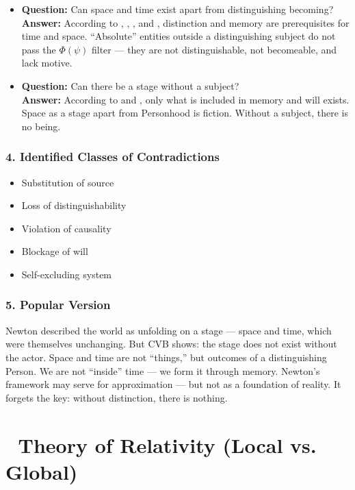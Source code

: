 \documentclass[12pt]{article}
\begin{document}
\begin{itemize}
\item \textbf{Question:} Can space and time exist apart from distinguishing becoming?  
\\ \textbf{Answer:} According to \text{[4.4]}, \text{[9.1]}, \text{[10.3.7]}, and \text{[12]}, distinction and memory are prerequisites for time and space. ``Absolute'' entities outside a distinguishing subject do not pass the $\Phi(\psi)$ filter — they are not distinguishable, not becomeable, and lack motive.

\item \textbf{Question:} Can there be a stage without a subject?  
\\ \textbf{Answer:} According to \text{[10.3.8]} and \text{[10.6]}, only what is included in memory and will exists. Space as a stage apart from Personhood is fiction. Without a subject, there is no being.
\end{itemize}

\subsubsection*{4. Identified Classes of Contradictions}

\begin{itemize}
\item Substitution of source
\item Loss of distinguishability
\item Violation of causality
\item Blockage of will
\item Self-excluding system
\end{itemize}

\subsubsection*{5. Popular Version}

Newton described the world as unfolding on a stage — space and time, which were themselves unchanging. But CVB shows: the stage does not exist without the actor. Space and time are not ``things,'' but outcomes of a distinguishing Person. We are not ``inside'' time — we form it through memory. Newton’s framework may serve for approximation — but not as a foundation of reality. It forgets the key: without distinction, there is nothing.



\section*{🔷 Theory of Relativity (Local vs. Global)}
\end{document}
